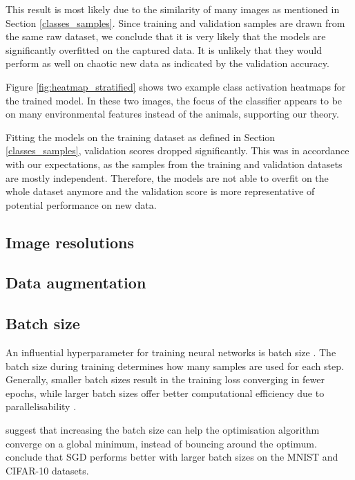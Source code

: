\documentclass{l4proj}
\begin{document}
This result is most likely due to the similarity of many images as mentioned in Section \ref{classes_samples}. Since training and validation samples are drawn from the same raw dataset, we conclude that it is very likely that the models are significantly overfitted on the captured data. It is unlikely that they would perform as well on chaotic new data as indicated by the validation accuracy. 

Figure \ref{fig:heatmap_stratified} shows two example class activation heatmaps for the trained model. In these two images, the focus of the classifier appears to be on many environmental features instead of the animals, supporting our theory.

Fitting the models on the training dataset as defined in Section \ref{classes_samples}, validation scores dropped significantly. This was in accordance with our expectations, as the samples from the training and validation datasets are mostly independent. Therefore, the models are not able to overfit on the whole dataset anymore and the validation score is more representative of potential performance on new data.

\subsection{Image resolutions}

\subsection{Data augmentation}

\subsection{Batch size}

An influential hyperparameter for training neural networks is batch size \citep{ioffe_batch_2015}. The batch size during training determines how many samples are used for each step. Generally, smaller batch sizes result in the training loss converging in fewer epochs, while larger batch sizes offer better computational efficiency due to parallelisability \cite{devarakonda_adabatch_2018}.

\citet{smith_dont_2018} suggest that increasing the batch size can help the optimisation algorithm converge on a global minimum, instead of bouncing around the optimum. \citet{radiuk_impact_2017} conclude that SGD performs better with larger batch sizes on the MNIST and CIFAR-10 datasets.
\end{document}
